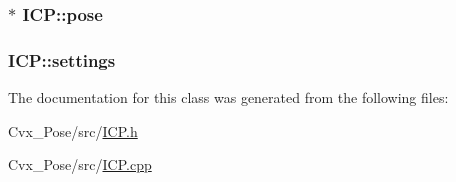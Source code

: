 \hypertarget{classICP_a09c458b7e1daa98c6cc98177003794ce}{
\subsubsection[{pose}]{$\ast$ {\bf \-I\-C\-P\-::pose}}}\label{classICP_a09c458b7e1daa98c6cc98177003794ce}
\hypertarget{classICP_a7e3065919f63c9bdc0ff0677b5cf56d0}{
\subsubsection[{settings}]{ {\bf \-I\-C\-P\-::settings}}}\label{classICP_a7e3065919f63c9bdc0ff0677b5cf56d0}


\-The documentation for this class was generated from the following files\-:\begin{DoxyCompactItemize}
\item 
\-Cvx\-\_\-\-Pose/src/\hyperlink{ICP_8h}{\-I\-C\-P.\-h}\item 
\-Cvx\-\_\-\-Pose/src/\hyperlink{ICP_8cpp}{\-I\-C\-P.\-cpp}\end{DoxyCompactItemize}
